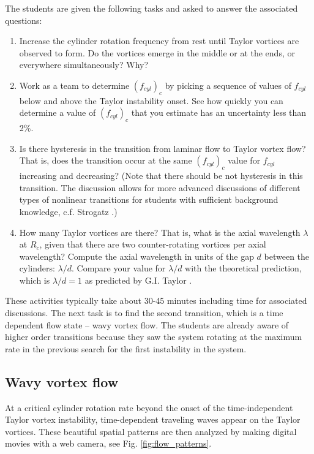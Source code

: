 \documentclass[%
 amsmath,amssymb,
 aps,
floatfix,
aps,prd,longbibliography,
notitlepage
]{revtex4-1}
\begin{document}
The students are given the following tasks and asked to answer the associated questions:
\begin{enumerate}
\item  Increase the cylinder rotation frequency from rest until Taylor vortices are observed to form.  Do the vortices emerge in the middle or at the ends, or everywhere simultaneously? Why? 
\item  Work as a team to determine $(f_{cyl})_c$ by picking a sequence of values of 
$f_{cyl}$ below and above the Taylor instability onset.  See how quickly you can determine a value of $(f_{cyl})_c$ that you estimate has an uncertainty less than 2\%. 
\item Is there hysteresis in the transition from laminar flow to Taylor vortex flow? That is, does the transition occur at the same  $(f_{cyl})_c$ value for $f_{cyl}$ increasing and decreasing? (Note that there should be not hysteresis in this transition. The discussion allows for more advanced discussions of different types of nonlinear transitions for students with sufficient background knowledge, c.f. Strogatz \cite{strogatz}.)
\item  How many Taylor vortices are there? That is, what is the axial wavelength $\lambda$ at  $R_c$, given that there are two counter-rotating vortices per axial wavelength?  Compute the axial wavelength in units of the gap $d$ between the cylinders:  $\lambda/d$. Compare your value for $\lambda/d$ with the theoretical prediction, which is $\lambda/d=1$ as predicted by G.I. Taylor \cite{taylor}.
\end{enumerate}
These activities typically take about 30-45 minutes including time for associated discussions. The next task is to find the second transition, which is a time dependent flow state -- wavy vortex flow. The students are already aware of higher order transitions because they saw the system rotating at the maximum rate in the previous search for the first instability in the system.   

\subsection{Wavy vortex flow}

At a critical cylinder rotation rate beyond the onset of the  time-independent Taylor vortex instability, time-dependent traveling waves appear on the Taylor vortices. These beautiful spatial patterns are then analyzed by making digital movies with a web camera, see Fig. \ref{fig:flow_patterns}.
\end{document}
